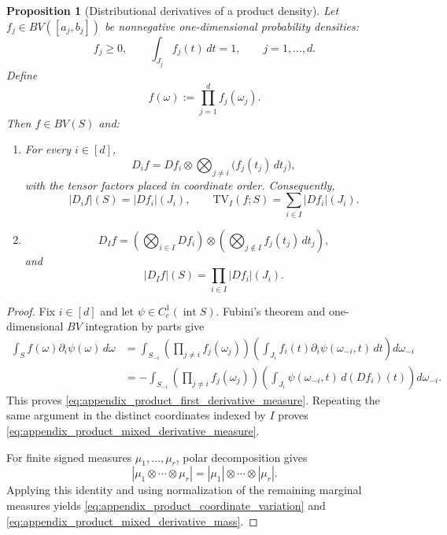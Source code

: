 \documentclass[11pt,letterpaper]{article}
\newtheorem{proposition}[theorem]{Proposition}
\theoremstyle{definition}
\theoremstyle{remark}
\newcommand{\TV}{\mathrm{TV}}
\begin{document}
\begin{proposition}[Distributional derivatives of a product density]
\label{prop:appendix_product_distributional_derivatives}
Let $f_j\in BV([a_j,b_j])$ be nonnegative one-dimensional probability densities:
$$
f_j\ge0,
\qquad
\int_{J_j}f_j(t)\,dt=1,
\qquad
j=1,\ldots,d.
$$
Define
$$
f(\omega):=\prod_{j=1}^d f_j(\omega_j).
$$
Then $f\in BV(S)$ and:

\begin{enumerate}
\item[\emph{(i)}] For every $i\in[d]$,
\begin{equation}
\label{eq:appendix_product_first_derivative_measure}
D_i f
=
Df_i\otimes
\bigotimes_{j\neq i}\bigl(f_j(t_j)\,dt_j\bigr),
\end{equation}
with the tensor factors placed in coordinate order. Consequently,
\begin{equation}
\label{eq:appendix_product_coordinate_variation}
|D_i f|(S)=|Df_i|(J_i),
\qquad
\TV_I(f;S)=\sum_{i\in I}|Df_i|(J_i).
\end{equation}

\item[\emph{(ii)}]
\begin{equation}
\label{eq:appendix_product_mixed_derivative_measure}
D_I f
=
\left(\bigotimes_{i\in I}Df_i\right)
\otimes
\left(\bigotimes_{j\notin I}f_j(t_j)\,dt_j\right),
\end{equation}
and
\begin{equation}
\label{eq:appendix_product_mixed_derivative_mass}
|D_I f|(S)
=
\prod_{i\in I}|Df_i|(J_i).
\end{equation}
\end{enumerate}
\end{proposition}

\begin{proof}
Fix $i\in[d]$ and let $\psi\in C_c^1(\operatorname{int}S)$. Fubini's theorem
and one-dimensional $BV$ integration by parts give
$$
\begin{aligned}
\int_S f(\omega)\partial_i\psi(\omega)\,d\omega
&=
\int_{S_{-i}}
\left(\prod_{j\neq i}f_j(\omega_j)\right)
\left(\int_{J_i}f_i(t)\partial_i\psi(\omega_{-i},t)\,dt\right)d\omega_{-i}
\\
&=
-
\int_{S_{-i}}
\left(\prod_{j\neq i}f_j(\omega_j)\right)
\left(\int_{J_i}\psi(\omega_{-i},t)\,d(Df_i)(t)\right)d\omega_{-i}.
\end{aligned}
$$
This proves \eqref{eq:appendix_product_first_derivative_measure}. Repeating the
same argument in the distinct coordinates indexed by $I$ proves
\eqref{eq:appendix_product_mixed_derivative_measure}.

For finite signed measures $\mu_1,\ldots,\mu_r$, polar decomposition gives
$$
|\mu_1\otimes\cdots\otimes\mu_r|
=
|\mu_1|\otimes\cdots\otimes|\mu_r|.
$$
Applying this identity and using normalization of the remaining marginal
measures yields \eqref{eq:appendix_product_coordinate_variation} and
\eqref{eq:appendix_product_mixed_derivative_mass}.
\end{proof}
\end{document}
